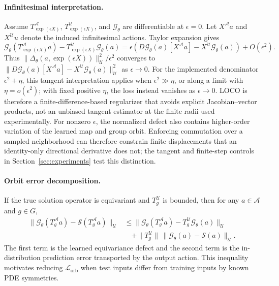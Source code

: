 \paragraph{Infinitesimal interpretation.} Assume \(T_{\exp(\epsilon X)}^{\mathcal A}\), \(T_{\exp(\epsilon X)}^{\mathcal U}\), and \(\mathcal G_\theta\) are differentiable at \(\epsilon=0\). Let \(X^{\mathcal A}a\) and \(X^{\mathcal U}u\) denote the induced infinitesimal actions. Taylor expansion gives
\begin{equation}
\mathcal G_\theta(T_{\exp(\epsilon X)}^{\mathcal A}a)-T_{\exp(\epsilon X)}^{\mathcal U}\mathcal G_\theta(a)=\epsilon\left(D\mathcal G_\theta(a)[X^{\mathcal A}a]-X^{\mathcal U}\mathcal G_\theta(a)\right)+O(\epsilon^2).
\end{equation}
Thus \(\|\Delta_\theta(a,\exp(\epsilon X))\|_{\mathcal U}^2/\epsilon^2\) converges to \(\|D\mathcal G_\theta(a)[X^{\mathcal A}a]-X^{\mathcal U}\mathcal G_\theta(a)\|_{\mathcal U}^2\) as \(\epsilon\to0\). For the implemented denominator \(\epsilon^2+\eta\), this tangent interpretation applies when \(\epsilon^2\gg\eta\), or along a limit with \(\eta=o(\epsilon^2)\); with fixed positive \(\eta\), the loss instead vanishes as \(\epsilon\to0\). LOCO is therefore a finite-difference-based regularizer that avoids explicit Jacobian--vector products, not an unbiased tangent estimator at the finite radii used experimentally. For nonzero \(\epsilon\), the normalized defect also contains higher-order variation of the learned map and group orbit. Enforcing commutation over a sampled neighborhood can therefore constrain finite displacements that an identity-only directional derivative does not; the tangent and finite-step controls in Section~\ref{sec:experiments} test this distinction.

\paragraph{Orbit error decomposition.} If the true solution operator is equivariant and \(T_g^{\mathcal U}\) is bounded, then for any \(a\in\mathcal A\) and \(g\in G\),
\begin{align}
\|\mathcal G_\theta(T_g^{\mathcal A}a)-\mathcal S(T_g^{\mathcal A}a)\|_{\mathcal U}
&\le \|\mathcal G_\theta(T_g^{\mathcal A}a)-T_g^{\mathcal U}\mathcal G_\theta(a)\|_{\mathcal U} \nonumber\\
&\quad+\|T_g^{\mathcal U}\|\,\|\mathcal G_\theta(a)-\mathcal S(a)\|_{\mathcal U}.
\end{align}
The first term is the learned equivariance defect and the second term is the in-distribution prediction error transported by the output action. This inequality motivates reducing \(\mathcal L_{\mathrm{orb}}\) when test inputs differ from training inputs by known PDE symmetries.

